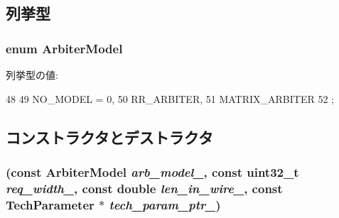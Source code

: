 \subsection{列挙型}
\hypertarget{classArbiter_a7c7da240d2e3c4e80b6a4ff22a3a2ce5}{
\subsubsection[{ArbiterModel}]{\setlength{\rightskip}{0pt plus 5cm}enum {\bf ArbiterModel}}}
\label{classArbiter_a7c7da240d2e3c4e80b6a4ff22a3a2ce5}
\begin{Desc}
\item[列挙型の値: ]\par
\begin{description}
\item[{\em 
\hypertarget{classArbiter_a7c7da240d2e3c4e80b6a4ff22a3a2ce5abab57b6e2c553e4d983f415a1f4ea75b}{
NO\_\-MODEL}
\label{classArbiter_a7c7da240d2e3c4e80b6a4ff22a3a2ce5abab57b6e2c553e4d983f415a1f4ea75b}
}]\item[{\em 
\hypertarget{classArbiter_a7c7da240d2e3c4e80b6a4ff22a3a2ce5a28977651d2b351b14aa831cdbf1f24ff}{
RR\_\-ARBITER}
\label{classArbiter_a7c7da240d2e3c4e80b6a4ff22a3a2ce5a28977651d2b351b14aa831cdbf1f24ff}
}]\item[{\em 
\hypertarget{classArbiter_a7c7da240d2e3c4e80b6a4ff22a3a2ce5a0fd7b312f9fc53fbcb70f2d09bdf82a4}{
MATRIX\_\-ARBITER}
\label{classArbiter_a7c7da240d2e3c4e80b6a4ff22a3a2ce5a0fd7b312f9fc53fbcb70f2d09bdf82a4}
}]\end{description}
\end{Desc}




\begin{DoxyCode}
48     {
49       NO_MODEL = 0,
50       RR_ARBITER,
51       MATRIX_ARBITER
52     };
\end{DoxyCode}


\subsection{コンストラクタとデストラクタ}
\hypertarget{classArbiter_a84a0961d527c230288a18b2a3ea80f24}{
\subsubsection[{Arbiter}]{ (const {\bf ArbiterModel} {\em arb\_\-model\_\-}, \/  const {\bf uint32\_\-t} {\em req\_\-width\_\-}, \/  const double {\em len\_\-in\_\-wire\_\-}, \/  const {\bf TechParameter} $\ast$ {\em tech\_\-param\_\-ptr\_\-})}}
\label{classArbiter_a84a0961d527c230288a18b2a3ea80f24}



